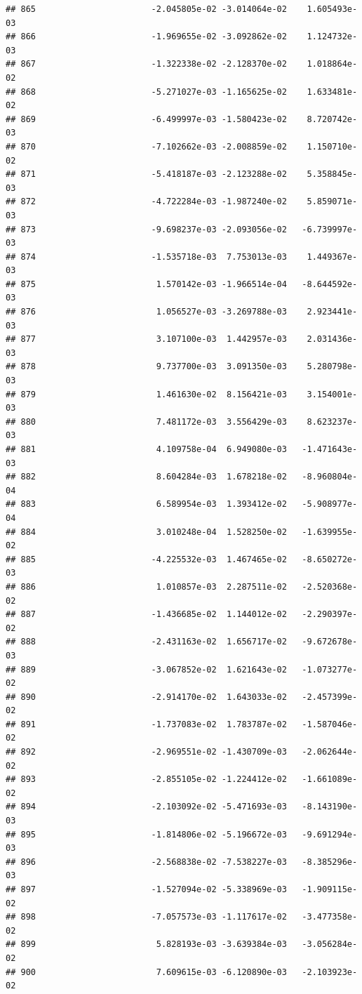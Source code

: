 \documentclass[
]{article}
\begin{document}
\begin{verbatim}
## 865                       -2.045805e-02 -3.014064e-02    1.605493e-03
## 866                       -1.969655e-02 -3.092862e-02    1.124732e-03
## 867                       -1.322338e-02 -2.128370e-02    1.018864e-02
## 868                       -5.271027e-03 -1.165625e-02    1.633481e-02
## 869                       -6.499997e-03 -1.580423e-02    8.720742e-03
## 870                       -7.102662e-03 -2.008859e-02    1.150710e-02
## 871                       -5.418187e-03 -2.123288e-02    5.358845e-03
## 872                       -4.722284e-03 -1.987240e-02    5.859071e-03
## 873                       -9.698237e-03 -2.093056e-02   -6.739997e-03
## 874                       -1.535718e-03  7.753013e-03    1.449367e-03
## 875                        1.570142e-03 -1.966514e-04   -8.644592e-03
## 876                        1.056527e-03 -3.269788e-03    2.923441e-03
## 877                        3.107100e-03  1.442957e-03    2.031436e-03
## 878                        9.737700e-03  3.091350e-03    5.280798e-03
## 879                        1.461630e-02  8.156421e-03    3.154001e-03
## 880                        7.481172e-03  3.556429e-03    8.623237e-03
## 881                        4.109758e-04  6.949080e-03   -1.471643e-03
## 882                        8.604284e-03  1.678218e-02   -8.960804e-04
## 883                        6.589954e-03  1.393412e-02   -5.908977e-04
## 884                        3.010248e-04  1.528250e-02   -1.639955e-02
## 885                       -4.225532e-03  1.467465e-02   -8.650272e-03
## 886                        1.010857e-03  2.287511e-02   -2.520368e-02
## 887                       -1.436685e-02  1.144012e-02   -2.290397e-02
## 888                       -2.431163e-02  1.656717e-02   -9.672678e-03
## 889                       -3.067852e-02  1.621643e-02   -1.073277e-02
## 890                       -2.914170e-02  1.643033e-02   -2.457399e-02
## 891                       -1.737083e-02  1.783787e-02   -1.587046e-02
## 892                       -2.969551e-02 -1.430709e-03   -2.062644e-02
## 893                       -2.855105e-02 -1.224412e-02   -1.661089e-02
## 894                       -2.103092e-02 -5.471693e-03   -8.143190e-03
## 895                       -1.814806e-02 -5.196672e-03   -9.691294e-03
## 896                       -2.568838e-02 -7.538227e-03   -8.385296e-03
## 897                       -1.527094e-02 -5.338969e-03   -1.909115e-02
## 898                       -7.057573e-03 -1.117617e-02   -3.477358e-02
## 899                        5.828193e-03 -3.639384e-03   -3.056284e-02
## 900                        7.609615e-03 -6.120890e-03   -2.103923e-02

\end{verbatim}
\end{document}
